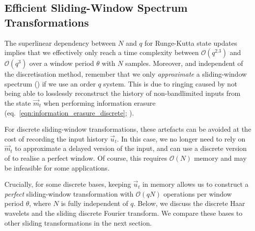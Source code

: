 %


\subsection{Efficient Sliding-Window Spectrum Transformations}
\label{sec:efficient_sliding_window}

The superlinear dependency between $N$ and $q$ for Runge-Kutta state updates implies that we effectively only reach a time complexity between $\mathcal{O}(q^{2.3})$ and $\mathcal{O}(q^3)$ over a window period $\theta$ with $N$ samples.
Moreover, and independent of the discretisation method, remember that we only \emph{approximate} a sliding-window spectrum () if we use an order $q$ \LTI system.
This is due to ringing caused by not being able to losslessly reconstruct the history of non-bandlimited inputs from the state $\vec m_t$ when performing information erasure (eq.~\ref{eqn:information_erasure_discrete}; ).

For discrete sliding-window transformations, these artefacts can be avoided at the cost of recording the input history $\vec u_t$.
In this case, we no longer need to rely on $\vec m_t$ to approximate a delayed version of the input, and can use a discrete version of  to realise a perfect window.
Of course, this requires $\mathcal{O}(N)$ memory and may be infeasible for some applications.

Crucially, for some discrete bases, keeping $\vec u_t$ in memory allows us to construct a \emph{perfect} sliding-window transformation with $\mathcal{O}(qN)$ operations per window period $\theta$, where $N$ is fully independent of $q$.
Below, we discuss the discrete Haar wavelets and the sliding discrete Fourier transform.
We compare these bases to other sliding transformations in the next section.

